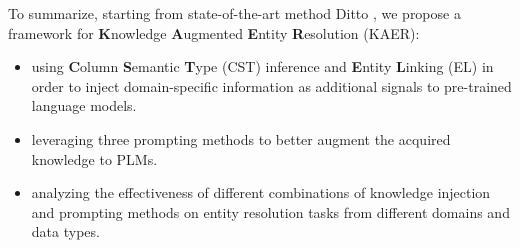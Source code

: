 To summarize, starting from state-of-the-art method Ditto \cite{li_deep_2020}, we propose a framework for  \textbf{K}nowledge \textbf{A}ugmented \textbf{E}ntity \textbf{R}esolution (KAER):
\begin{itemize}
    \item using \textbf{C}olumn \textbf{S}emantic \textbf{T}ype (CST) inference and \textbf{E}ntity \textbf{L}inking (EL) in order to inject domain-specific information as additional signals to pre-trained language models. 
    \item leveraging three prompting methods to better augment the acquired knowledge to PLMs.
    \item analyzing the effectiveness of different combinations of knowledge injection and prompting methods on entity resolution tasks from different domains and data types.
\end{itemize}

    
